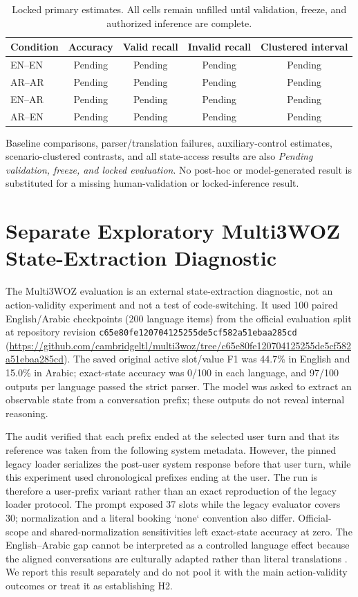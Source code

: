 \documentclass[11pt]{article}
\newcommand{\pending}{\textit{Pending validation, freeze, and locked evaluation}}
\begin{document}
\begin{table}[t]
\centering
\small
\begin{tabular}{lcccc}
\toprule
Condition & Accuracy & Valid recall & Invalid recall & Clustered interval \\
\midrule
EN--EN & Pending & Pending & Pending & Pending \\
AR--AR & Pending & Pending & Pending & Pending \\
EN--AR & Pending & Pending & Pending & Pending \\
AR--EN & Pending & Pending & Pending & Pending \\
\bottomrule
\end{tabular}
\caption{Locked primary estimates. All cells remain unfilled until validation, freeze, and authorized inference are complete.}
\label{tab:locked-primary-pending}
\end{table}

Baseline comparisons, parser/translation failures, auxiliary-control estimates, scenario-clustered contrasts, and all state-access results are also \pending. No post-hoc or model-generated result is substituted for a missing human-validation or locked-inference result.

\appendix
\section{Separate Exploratory Multi3WOZ State-Extraction Diagnostic}
\label{app:multi3woz}
The Multi3WOZ evaluation is an external state-extraction diagnostic, not an action-validity experiment and not a test of code-switching. It used 100 paired English/Arabic checkpoints (200 language items) from the official evaluation split at repository revision \texttt{c65e80fe120704125255de5cf582a51ebaa285cd} (\url{https://github.com/cambridgeltl/multi3woz/tree/c65e80fe120704125255de5cf582a51ebaa285cd}). The saved original active slot/value F1 was 44.7\% in English and 15.0\% in Arabic; exact-state accuracy was 0/100 in each language, and 97/100 outputs per language passed the strict parser. The model was asked to extract an observable state from a conversation prefix; these outputs do not reveal internal reasoning.

The audit verified that each prefix ended at the selected user turn and that its reference was taken from the following system metadata. However, the pinned legacy loader serializes the post-user system response before that user turn, while this experiment used chronological prefixes ending at the user. The run is therefore a user-prefix variant rather than an exact reproduction of the legacy loader protocol. The prompt exposed 37 slots while the legacy evaluator covers 30; normalization and a literal booking `none` convention also differ. Official-scope and shared-normalization sensitivities left exact-state accuracy at zero. The English--Arabic gap cannot be interpreted as a controlled language effect because the aligned conversations are culturally adapted rather than literal translations \citep{hu-etal-2023-multi3}. We report this result separately and do not pool it with the main action-validity outcomes or treat it as establishing H2.



\end{document}
